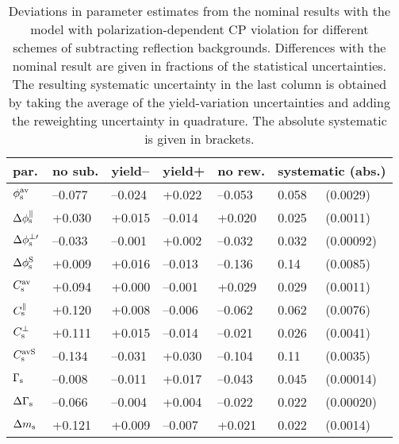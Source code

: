 \begin{table}[htbp]
  \centering
  \caption{Deviations in parameter estimates from the nominal results with the model with polarization-dependent CP violation for
           different schemes of subtracting reflection backgrounds.
           Differences with the nominal result are given in fractions of the statistical uncertainties. The resulting systematic
           uncertainty in the last column is obtained by taking the average of the yield-variation uncertainties and adding the reweighting
           uncertainty in quadrature. The absolute systematic is given in brackets.}
  \label{tab:syst_mass_peaking_polarDep}
  \begin{tabular}{lllllll}
    \hline
    par.            &  no sub.    &  yield--  &  yield+   &  no rew.  &  \multicolumn{2}{l}{systematic (abs.)}  \\
    \hline
    $\phi_\text{s}^{\text{av}}$       &  --0.077    &  --0.024  &   +0.022  &  --0.053  &  0.058  &  (0.0029)                     \\
    $\Delta\phi_\text{s}^\parallel$  &   +0.030    &   +0.015  &  --0.014  &   +0.020  &  0.025  &  (0.0011)                     \\
    $\Delta\phi_\text{s}^{\perp\prime}$ &  --0.033    &  --0.001  &   +0.002  &  --0.032  &  0.032  &  (0.00092)                    \\
    $\Delta\phi_\text{s}^\text{S}$     &   +0.009    &   +0.016  &  --0.013  &  --0.136  &  0.14   &  (0.0085)                     \\
    \hline
    $C_\text{s}^\text{av}$         &   +0.094    &   +0.000  &  --0.001  &   +0.029  &  0.029  &  (0.0011)                     \\
    $C_\text{s}^\parallel$    &   +0.120    &   +0.008  &  --0.006  &  --0.062  &  0.062  &  (0.0076)                     \\
    $C_\text{s}^\perp$    &   +0.111    &   +0.015  &  --0.014  &  --0.021  &  0.026  &  (0.0041)                     \\
    $C_\text{s}^\text{avS}$        &  --0.134    &  --0.031  &   +0.030  &  --0.104  &  0.11   &  (0.0035)                     \\
    \hline
    $\Gamma_\text{s}$           &  --0.008    &  --0.011  &   +0.017  &  --0.043  &  0.045  &  (0.00014)                    \\
    $\Delta\Gamma_\text{s}$          &  --0.066    &  --0.004  &   +0.004  &  --0.022  &  0.022  &  (0.00020)                    \\
    $\Delta m_\text{s}$          &   +0.121    &   +0.009  &  --0.007  &   +0.021  &  0.022  &  (0.0014)                     \\

\end{tabular}
\end{table}

